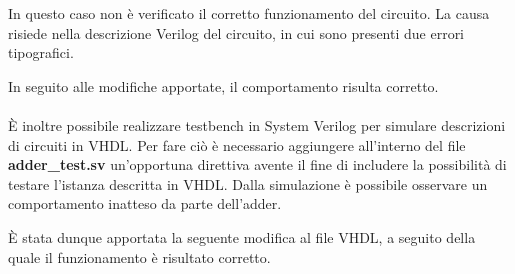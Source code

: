 \documentclass[11pt,  english, makeidx, a4paper, titlepage, oneside]{book}
\newenvironment{listato}{\footnotesize} {\normalsize }
\begin{document}
\vspace{0.3cm}
In questo caso non è verificato il corretto funzionamento del circuito. La causa risiede nella descrizione Verilog del circuito, in cui sono presenti due errori tipografici.
\begin{center}
\begin{listato}
	\centerline{}
\end{listato}
\end{center}
\vspace{0.3cm}
In seguito alle modifiche apportate, il comportamento risulta corretto.
\\\\
È inoltre possibile realizzare testbench in System Verilog per simulare descrizioni di circuiti in VHDL. Per fare ciò è necessario aggiungere all'interno del file \textbf{adder\_test.sv} un'opportuna direttiva avente il fine di includere la possibilità di testare l'istanza descritta in VHDL. 
Dalla simulazione è possibile osservare un comportamento inatteso da parte dell'adder.
\begin{center}
\begin{listato}
	\centerline{}
\end{listato}
\end{center}
\vspace{0.3cm}
È stata dunque apportata la seguente modifica al file VHDL, a seguito della quale il funzionamento è risultato corretto.
\begin{center}
\begin{listato}
	\centerline{}
\end{listato}
\end{center}
\vspace{0.3cm}
\newpage
\end{document}
